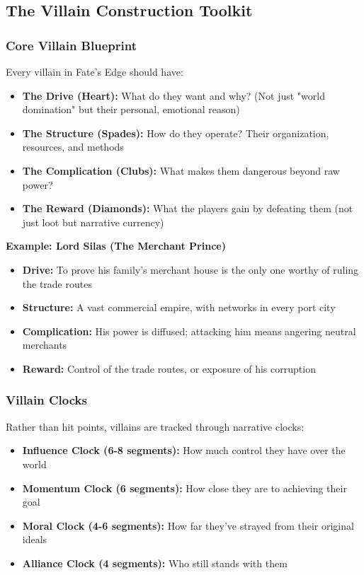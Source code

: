 \subsection{The Villain Construction Toolkit}

\subsubsection{Core Villain Blueprint}

Every villain in Fate's Edge should have:

\begin{itemize}
  \item \textbf{The Drive (Heart):} What do they want and why? (Not just "world domination" but their personal, emotional reason)
  \item \textbf{The Structure (Spades):} How do they operate? Their organization, resources, and methods
  \item \textbf{The Complication (Clubs):} What makes them dangerous beyond raw power?
  \item \textbf{The Reward (Diamonds):} What the players gain by defeating them (not just loot but narrative currency)
\end{itemize}

\textbf{Example: Lord Silas (The Merchant Prince)}
\begin{itemize}
  \item \textbf{Drive:} To prove his family's merchant house is the only one worthy of ruling the trade routes
  \item \textbf{Structure:} A vast commercial empire, with networks in every port city
  \item \textbf{Complication:} His power is diffused; attacking him means angering neutral merchants
  \item \textbf{Reward:} Control of the trade routes, or exposure of his corruption
\end{itemize}

\subsubsection{Villain Clocks}

Rather than hit points, villains are tracked through narrative clocks:

\begin{itemize}
  \item \textbf{Influence Clock (6-8 segments):} How much control they have over the world
  \item \textbf{Momentum Clock (6 segments):} How close they are to achieving their goal
  \item \textbf{Moral Clock (4-6 segments):} How far they've strayed from their original ideals
  \item \textbf{Alliance Clock (4 segments):} Who still stands with them
\end{itemize}

